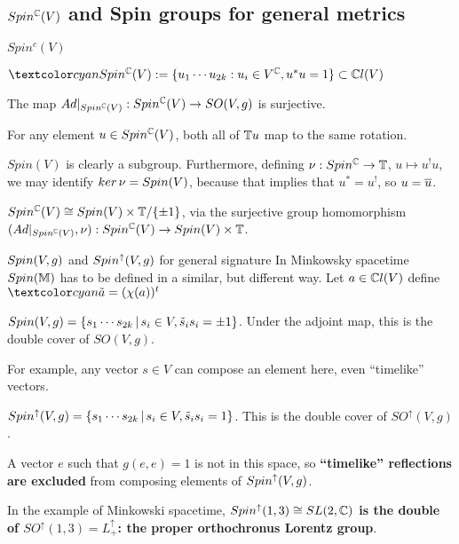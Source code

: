 \subsection{$Spin^\mathbb C(V)$ and Spin groups for general metrics}

\begin{frame}{$Spin^c(V)$} %

    \begin{Definition} $\defn{\spincv} := \set{u_1 \cdots u_{2k}: u_i \in V^\CC, u^*u = 1} \subset \cclv$
    \end{Definition}
    
    
    \begin{proposition}
    The map $Ad|_{Spin^\mathbb C(V)}: Spin^\mathbb C(V) \to SO(V, g)$ is surjective.
    
    For any element $u \in Spin^\mathbb C(V)$, both all of $\mathbb T u$ map to the same rotation.
    \end{proposition}
    
    $Spin(V)$ is clearly a subgroup. Furthermore,  defining $\nu: Spin^\mathbb C \to \mathbb T$, $u \mapsto u^! u$, we may identify $ker\,\nu = Spin(V)$, because that implies that $u^*= u^!$, so $u = \overline{u}$.
    
    $Spin^\mathbb C(V) \cong Spin(V) \times \mathbb T / \{\pm 1\}$, via the surjective group homomorphism $(Ad|_{Spin^\mathbb C(V)}, \nu): Spin^\mathbb C(V) \to Spin(V) \times \mathbb T$.
    
\end{frame}

\begin{frame}{$Spin(V, g)$ and $Spin^\uparrow(V, g)$ for general signature} %
    In Minkowsky spacetime $Spin(\mathbb M)$ has to be defined in a similar, but different way. Let $a \in \mathbb C l(V)$ define $\defn{\tilde a} = (\chi(a))^t$
    
    \begin{definition}
    $Spin(V, g) = \{s_1 \cdots s_{2k} \,|\, s_i \in V, \tilde s_i s_i = \pm 1\}$. Under the adjoint map, this is the double cover of $SO(V, g)$.
    \end{definition}
    
    For example, any vector $s \in V$ can compose an element here, even ``timelike'' vectors.
    
    \begin{definition}
    $Spin^\uparrow(V, g) = \{s_1 \cdots s_{2k} \,|\, s_i \in V, \tilde s_i s_i =  1\}$. This is the double cover of $SO^\uparrow(V, g)$.
    \end{definition}
    
    A vector $e$ such that $g(e, e)=1$ is not in this space, so \textbf{``timelike'' reflections are excluded} from composing elements of  $Spin^\uparrow(V, g)$.
    
    In the example of Minkowski spacetime, \textbf{$Spin^\uparrow(1, 3) \cong SL(2, \mathbb C)$ is the double of $SO^\uparrow(1, 3) = L^\uparrow_+$: the proper orthochronus Lorentz group}.
    
\end{frame}

